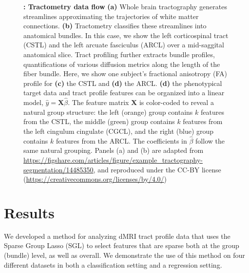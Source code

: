 \documentclass[10pt,letterpaper]{article}
\begin{document}
\begin{figure}[b!]
    {\label{fig:methods:tractogram}}
    {\label{fig:methods:cst}}
    {\label{fig:methods:tract-profile:cst}}
    {\label{fig:methods:tract-profile:fa}}
    {\label{fig:methods:group-structure}}
    \caption{\label{fig:methods}
    {\bf {}: Tractometry data flow}
    \textbf{(a)} Whole brain tractography generates streamlines approximating
        the trajectories of white matter connections.
        \textbf{(b)} Tractometry classifies these streamlines into anatomical bundles.
        In this case, we show the left corticospinal tract (CSTL)
        and the left arcuate fasciculus (ARCL)
        over a mid-saggital anatomical slice.
        Tract profiling further extracts bundle profiles,
        quantifications of various diffusion metrics along the length of the
        fiber bundle. Here, we show one subject's fractional anisotropy (FA)
        profile for \textbf{(c)} the CSTL and \textbf{(d)} the ARCL.
        \textbf{(d)} the phenotypical target data and tract profile
        features can be organized into a linear model, $\hat{y} = \mathbf{X}
        \hat{\beta}$. The feature matrix $\mathbf{X}$ is color-coded
        to reveal a natural group structure: the left (orange) group
        contains $k$ features from the CSTL, the middle (green) group
        contains $k$ features from the left cingulum cingulate (CGCL),
        and the right (blue) group
        contains $k$ features from the ARCL.
        The coefficients in $\hat{\beta}$ follow the same natural grouping. Panels (a) and (b) are adapted from \url{https://figshare.com/articles/figure/example_tractography-segmentation/14485350}, and reproduced under the CC-BY license (\url{https://creativecommons.org/licenses/by/4.0/})
    }
\end{figure}


\section*{Results}

We developed a method for analyzing dMRI tract profile data that uses the Sparse
Group Lasso (SGL) to select features that are sparse both at the group (bundle) level, as well as overall.
We demonstrate the use of this method on four different datasets in
both a classification setting and a regression setting.
\end{document}
